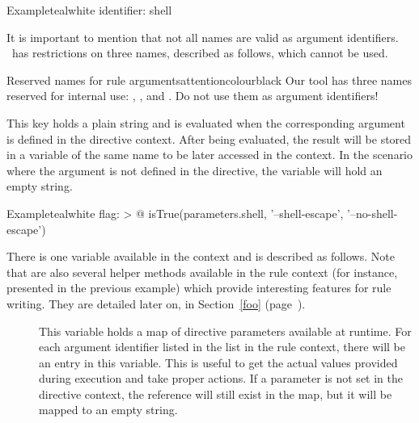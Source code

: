 \begin{description}
\begin{description}
\begin{codebox}{Example}{teal}{\icnote}{white}
identifier: shell
\end{codebox}

It is important to mention that not all names are valid as argument identifiers. \arara\ has restrictions on three names, described as follows, which cannot be used.

\begin{messagebox}{Reserved names for rule arguments}{attentioncolour}{\icattention}{black}
Our tool has three names reserved for internal use: , , and . Do not use them as argument identifiers!
\end{messagebox}

\item[\describecontext{O}{arguments}{flag}] This key holds a plain string and is evaluated when the corresponding argument is defined in the directive context.  After being evaluated, the result will be stored in a variable of the same name to be later accessed in the  context. In the scenario where the argument is not defined in the directive, the variable will hold an empty string.

\begin{codebox}{Example}{teal}{\icnote}{white}
flag: >
  @{
      isTrue(parameters.shell, '--shell-escape',
             '--no-shell-escape')
  }
\end{codebox}

There is one variable available in the  context and is described as follows. Note that are also several helper methods available in the rule context (for instance,  presented in the previous example) which provide interesting features for rule writing. They are detailed later on, in Section~\ref{foo} (page~\pageref{foo}).

\begin{description}
\item[] This variable holds a map of directive parameters available at runtime. For each argument identifier listed in the  list in the rule context, there will be an entry in this variable. This is useful to get the actual values provided during execution and take proper actions. If a parameter is not set in the directive context, the reference will still exist in the map, but it will be mapped to an empty string.
\end{description}


\end{description}
\end{description}
